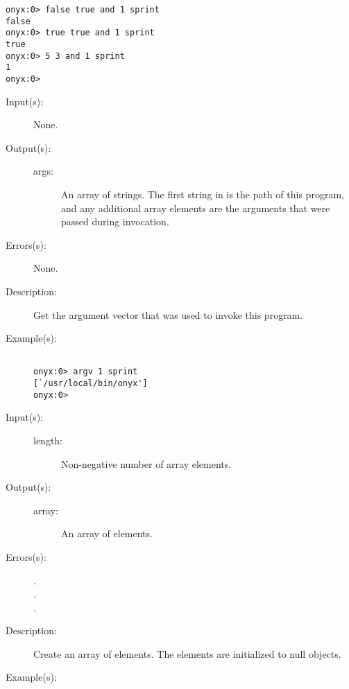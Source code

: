 \begin{description}
\begin{description}
\begin{verbatim}
onyx:0> false true and 1 sprint
false
onyx:0> true true and 1 sprint
true
onyx:0> 5 3 and 1 sprint
1
onyx:0>
		\end{verbatim}
	\end{description}
\label{systemdict:argv}
\item[{\onyxop{--}{argv}{args}}: ]
	\begin{description}\item[]
	\item[Input(s): ] None.
	\item[Output(s): ]
		\begin{description}\item[]
		\item[args: ]
			An array of strings.  The first string in 
			is the path of this program, and any additional
			array elements are the arguments that were passed during
			invocation.
		\end{description}
	\item[Errors(s): ] None.
	\item[Description: ]
		Get the argument vector that was used to invoke this program.
	\item[Example(s): ]\begin{verbatim}

onyx:0> argv 1 sprint
[`/usr/local/bin/onyx']
onyx:0>
		\end{verbatim}
	\end{description}
\label{systemdict:array}
\item[{\onyxop{length}{array}{array}}: ]
	\begin{description}\item[]
	\item[Input(s): ]
		\begin{description}\item[]
		\item[length: ]
			Non-negative number of array elements.
		\end{description}
	\item[Output(s): ]
		\begin{description}\item[]
		\item[array: ]
			An array of  elements.
		\end{description}
	\item[Errors(s): ]
		\begin{description}\item[]
		\item[.]
		\item[.]
		\item[.]
		\end{description}
	\item[Description: ]
		Create an array of  elements.  The elements are
		initialized to null objects.
	\item[Example(s): ]\begin{verbatim}


\end{verbatim}
\end{description}
\end{description}
